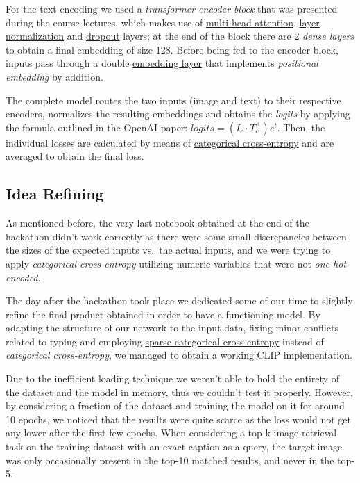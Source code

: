 \documentclass[12pt, a4paper]{article}
\begin{document}
For the text encoding we used a \textit{transformer encoder block} that was presented during the course lectures, which makes use of \href{https://www.tensorflow.org/api_docs/python/tf/keras/layers/MultiHeadAttention}{multi-head attention}, \href{https://www.tensorflow.org/api_docs/python/tf/keras/layers/LayerNormalization}{layer normalization} and \href{https://www.tensorflow.org/api_docs/python/tf/keras/layers/Dropout}{dropout} layers; at the end of the block there are 2 \textit{dense layers} to obtain a final embedding of size 128.
Before being fed to the encoder block, inputs pass through a double \href{https://www.tensorflow.org/api_docs/python/tf/keras/layers/Embedding}{embedding layer} that implements \textit{positional embedding} by addition.

The complete model routes the two inputs (image and text) to their respective encoders, normalizes the resulting embeddings and obtains the \textit{logits} by applying the formula outlined in the OpenAI paper: $logits = (I_e \cdot T_e^{\top})e^t$.
Then, the individual losses are calculated by means of \href{https://www.tensorflow.org/api_docs/python/tf/keras/losses/CategoricalCrossentropy}{categorical cross-entropy} and are averaged to obtain the final loss.

\subsection{Idea Refining}
As mentioned before, the very last notebook obtained at the end of the hackathon didn't work correctly as there were some small discrepancies between the sizes of the expected inputs vs.\ the actual inputs, and we were trying to apply \textit{categorical cross-entropy} utilizing numeric variables that were not \textit{one-hot encoded}.

The day after the hackathon took place we dedicated some of our time to slightly refine the final product obtained in order to have a functioning model.
By adapting the structure of our network to the input data, fixing minor conflicts related to typing and employing \href{https://www.tensorflow.org/api_docs/python/tf/keras/losses/SparseCategoricalCrossentropy}{sparse categorical cross-entropy} instead of \textit{categorical cross-entropy}, we managed to obtain a working CLIP implementation.

Due to the inefficient loading technique we weren't able to hold the entirety of the dataset and the model in memory, thus we couldn't test it properly.
However, by considering a fraction of the dataset and training the model on it for around 10 epochs, we noticed that the results were quite scarce as the loss would not get any lower after the first few epochs.
When considering a top-k image-retrieval task on the training dataset with an exact caption as a query, the target image was only occasionally present in the top-10 matched results, and never in the top-5.
\end{document}
